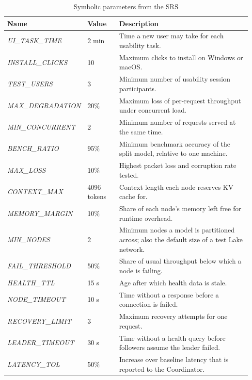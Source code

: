 \documentclass[12pt, titlepage]{article}
\begin{document}
\begin{table}[h]
\centering
\small
\caption{Symbolic parameters from the SRS}
\label{tab:vnv-constants}
\begin{tabularx}{\textwidth}{ll>{\raggedright\arraybackslash}X}
\toprule
\textbf{Name} & \textbf{Value} & \textbf{Description} \\
\midrule
\textit{UI\_TASK\_TIME} & 2 min & Time a new user may take for each usability
  task. \\
\textit{INSTALL\_CLICKS} & 10 & Maximum clicks to install on Windows or macOS. \\
\textit{TEST\_USERS} & 3 & Minimum number of usability session participants. \\
\textit{MAX\_DEGRADATION} & 20\% & Maximum loss of per-request throughput under
  concurrent load. \\
\textit{MIN\_CONCURRENT} & 2 & Minimum number of requests served at the same
  time. \\
\textit{BENCH\_RATIO} & 95\% & Minimum benchmark accuracy of the split model,
  relative to one machine. \\
\textit{MAX\_LOSS} & 10\% & Highest packet loss and corruption rate tested. \\
\textit{CONTEXT\_MAX} & 4096 tokens & Context length each node reserves KV cache
  for. \\
\textit{MEMORY\_MARGIN} & 10\% & Share of each node's memory left free for
  runtime overhead. \\
\textit{MIN\_NODES} & 2 & Minimum nodes a model is partitioned across; also the
  default size of a test Lake network. \\
\textit{FAIL\_THRESHOLD} & 50\% & Share of usual throughput below which a node is failing. \\
\textit{HEALTH\_TTL} & 15 s & Age after which health data is stale. \\
\textit{NODE\_TIMEOUT} & 10 s & Time without a response before a connection is failed. \\
\textit{RECOVERY\_LIMIT} & 3 & Maximum recovery attempts for one request. \\
\textit{LEADER\_TIMEOUT} & 30 s & Time without a health query before followers assume the leader failed. \\
\textit{LATENCY\_TOL} & 50\% & Increase over baseline latency that is reported
  to the Coordinator. \\
\bottomrule
\end{tabularx}
\end{table}
\end{document}
